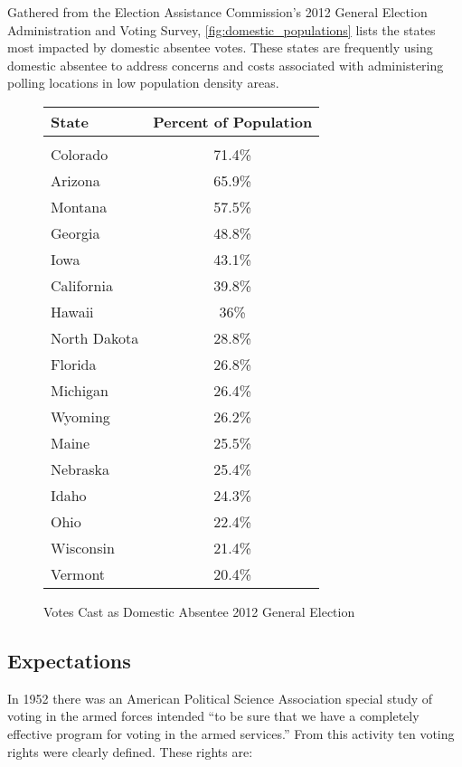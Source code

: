 Gathered from the Election Assistance Commission's 2012 General Election
Administration and Voting Survey, \autoref{fig:domestic_populations} lists the
states most impacted by domestic absentee votes. These states are frequently
using domestic absentee to address concerns and costs associated with
administering polling locations in low population density areas.

\begin{figure}
\begin{center}
\begin{tabular}{l c}
{\bf State} & {\bf Percent of Population}\\\hline\\
Colorado & 71.4\%\\
Arizona & 65.9\%\\
Montana & 57.5\%\\
Georgia & 48.8\%\\
Iowa & 43.1\%\\
California & 39.8\%\\
Hawaii & 36\%\\
North Dakota & 28.8\%\\
Florida & 26.8\%\\
Michigan & 26.4\%\\
Wyoming & 26.2\%\\
Maine & 25.5\%\\
Nebraska & 25.4\%\\
Idaho & 24.3\%\\
Ohio & 22.4\%\\
Wisconsin & 21.4\%\\
Vermont & 20.4\%\\
\end{tabular}
\end{center}
\caption{Votes Cast as Domestic Absentee 2012 General Election}
\label{fig:domestic_populations}
\end{figure}

\subsection{Expectations}

In 1952 there was an American Political Science Association special study of
voting in the armed forces intended ``to be sure that we have a completely
effective program for voting in the armed services.''
From this activity ten voting rights were clearly defined. These rights are:

